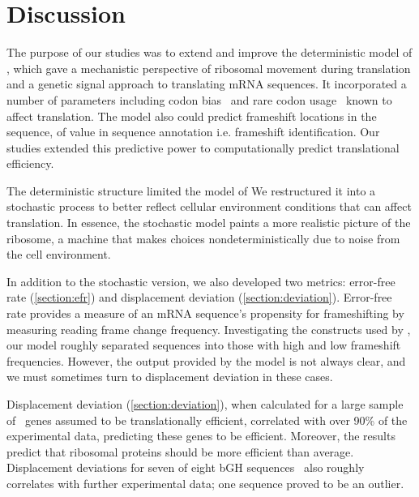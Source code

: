 \documentclass[12pt]{article}
\begin{document}
\section{Discussion}
\label{section:discussion}

The purpose of our studies was to extend and improve the deterministic
model of \citeauthor{lalit:mechanics}, which gave a mechanistic
perspective of ribosomal movement during translation and a genetic
signal approach to translating mRNA sequences. It incorporated a
number of parameters including
codon bias~\cite{ikemura} and rare codon usage~\cite{kane95} known to
affect translation. The model also could predict frameshift locations
in the sequence, of value in sequence annotation i.e. frameshift identification.
Our studies extended this predictive power to 
computationally predict translational efficiency.

The deterministic structure limited the model of \citeauthor{lalit:mechanics}
We restructured it into a stochastic process to better reflect cellular
environment conditions that can affect translation. In essence, the
stochastic model paints a more realistic picture of the ribosome, a
machine that makes choices nondeterministically due to noise from the
cell environment.

In addition to the stochastic version, we also developed two metrics:
error-free rate (\autoref{section:efr}) and displacement deviation
(\autoref{section:deviation}). Error-free rate
provides a measure of an mRNA sequence's propensity for frameshifting by
measuring reading frame change frequency.  Investigating the constructs used by
\citet{weiss87}, our model roughly separated sequences into
those with high and low frameshift frequencies. However, the
output provided by the model is not always clear, and we must sometimes turn to
displacement deviation in these cases.

Displacement deviation (\autoref{section:deviation}),
when calculated for a large sample of \ecoli\ genes assumed to be translationally efficient,
correlated with over 90\% of the  experimental data, predicting
these genes to be efficient.  Moreover, the results predict that ribosomal proteins should
be more efficient than average.  Displacement deviations for seven of eight bGH
sequences~\cite{schoner:bgh} also roughly correlates with further
experimental data; one sequence proved to be an outlier.
\end{document}
